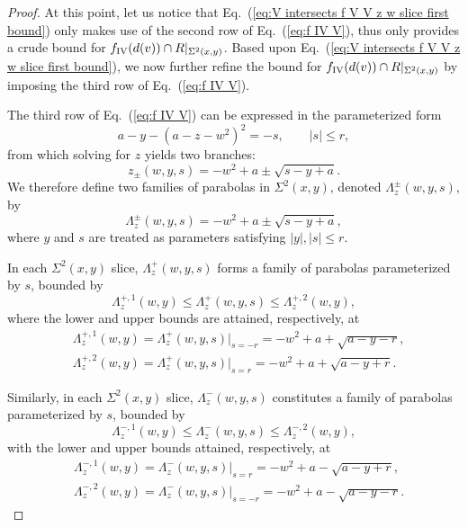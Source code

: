\documentclass[12pt]{iopart}
\begin{document}
\begin{proof}
At this point, let us notice that Eq.~(\ref{eq:V intersects f V V z w slice first bound}) only makes use of the second row of Eq.~(\ref{eq:f IV V}), thus only provides a crude bound for $f_{\rm IV}(d(v))\cap R|_{\Sigma^2(x,y)}$. Based upon Eq.~(\ref{eq:V intersects f V V z w slice first bound}), we now further refine the bound for $f_{\rm IV}(d(v))\cap R|_{\Sigma^2(x,y)}$ by imposing the third row of Eq.~(\ref{eq:f IV V}). 

The third row of Eq.~(\ref{eq:f IV V}) can be expressed in the parameterized form  
\begin{equation}\label{eq:z w parabola 2 f_V}
a - y - (a - z - w^2)^2 = -s, 
\qquad |s| \leq r,
\end{equation}
from which solving for \( z \) yields two branches:  
\begin{equation}\label{eq: z w parabola 2 f_V two branches}
z_{\pm}(w,y,s) = -w^2 + a \pm \sqrt{s - y + a}.
\end{equation}
We therefore define two families of parabolas in \(\Sigma^2(x,y)\), denoted \(\Lambda^{\pm}_z(w,y,s)\), by  
\begin{equation}\label{eq:Lambda z in terms of w y s}
\Lambda^{\pm}_z(w,y,s) = -w^2 + a \pm \sqrt{s - y + a},
\end{equation}
where \( y \) and \( s \) are treated as parameters satisfying \( |y|, |s| \leq r \).

In each \(\Sigma^2(x,y)\) slice, \(\Lambda^{+}_z(w,y,s)\) forms a family of parabolas parameterized by \(s\), bounded by  
\begin{equation}\label{eq:Lambda z + lower and upper bounds on each slice}
\Lambda^{+,1}_z(w,y) \leq \Lambda^{+}_z(w,y,s) \leq \Lambda^{+,2}_z(w,y),
\end{equation}  
where the lower and upper bounds are attained, respectively, at  
\begin{eqnarray}
& \Lambda^{+,1}_z(w,y) = \Lambda^+_z(w,y,s)\big|_{s=-r} = -w^2 + a + \sqrt{a-y-r}, \label{eq:Lambda z + 1} \\
& \Lambda^{+,2}_z(w,y) = \Lambda^+_z(w,y,s)\big|_{s=r}  = -w^2 + a + \sqrt{a-y+r}. \label{eq:Lambda z + 2}
\end{eqnarray}  

Similarly, in each \(\Sigma^2(x,y)\) slice, \(\Lambda^{-}_z(w,y,s)\) constitutes a family of parabolas parameterized by \(s\), bounded by  
\begin{equation}\label{eq:Lambda z - lower and upper bounds on each slice}
\Lambda^{-,1}_z(w,y) \leq \Lambda^{-}_z(w,y,s) \leq \Lambda^{-,2}_z(w,y),
\end{equation}  
with the lower and upper bounds attained, respectively, at  
\begin{eqnarray}
& \Lambda^{-,1}_z(w,y) = \Lambda^-_z(w,y,s)\big|_{s=r}  = -w^2 + a - \sqrt{a-y+r}, \label{eq:Lambda z - 1} \\
& \Lambda^{-,2}_z(w,y) = \Lambda^-_z(w,y,s)\big|_{s=-r} = -w^2 + a - \sqrt{a-y-r}. \label{eq:Lambda z - 2}
\end{eqnarray}  


\end{proof}
\end{document}
